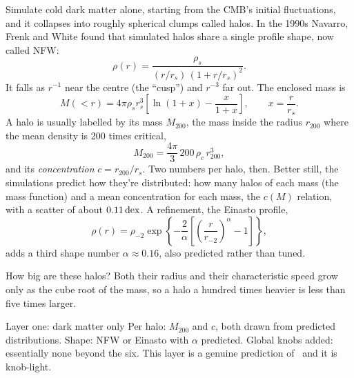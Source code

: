 Simulate cold dark matter alone, starting from the CMB's initial fluctuations, and it collapses into roughly spherical clumps called halos. In the 1990s Navarro, Frenk and White found that simulated halos share a single profile shape, now called NFW:
\begin{equation}
\rho(r)=\frac{\rho_s}{(r/r_s)\,(1+r/r_s)^2}.
\end{equation}
It falls as $r^{-1}$ near the centre (the ``cusp'') and $r^{-3}$ far out. The enclosed mass is
\begin{equation}
M(<r)=4\pi\rho_sr_s^3\left[\ln(1+x)-\frac{x}{1+x}\right],\qquad x=\frac{r}{r_s}.
\end{equation}
A halo is usually labelled by its mass $M_{200}$, the mass inside the radius $r_{200}$ where the mean density is 200 times critical,
\begin{equation}
M_{200}=\frac{4\pi}{3}\,200\,\rho_c\,r_{200}^3,
\end{equation}
and its \emph{concentration} $c=r_{200}/r_s$. Two numbers per halo, then. Better still, the simulations predict how they're distributed: how many halos of each mass (the mass function) and a mean concentration for each mass, the $c(M)$ relation, with a scatter of about $0.11\,\mathrm{dex}$. A refinement, the Einasto profile,
\begin{equation}
\rho(r)=\rho_{-2}\exp\left\{-\frac{2}{\alpha}\left[\left(\frac{r}{r_{-2}}\right)^{\alpha}-1\right]\right\},
\end{equation}
adds a third shape number $\alpha\approx0.16$, also predicted rather than tuned.



How big are these halos? Both their radius and their characteristic speed grow only as the cube root of the mass, so a halo a hundred times heavier is less than five times larger.




\begin{knobbox}{Layer one: dark matter only}
Per halo: $M_{200}$ and $c$, both drawn from predicted distributions. Shape: NFW or Einasto with $\alpha$ predicted. Global knobs added: essentially none beyond the six. This layer is a genuine prediction of \LCDM\, and it is knob-light.
\end{knobbox}

